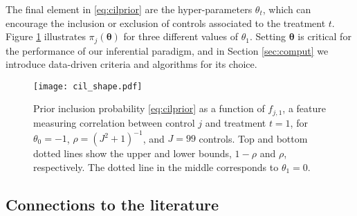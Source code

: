 \documentclass[12pt]{article}
\newcommand{\btheta}{{\bm{\theta}}}
\newcommand{\omcom}[1]{ {\color{blue} #1} }
\newcommand{\davidcom}[1]{{\color{red} [DR. #1]} }
\begin{document}
The final element in \eqref{eq:cilprior} are the hyper-parameters $\theta_t$, which can encourage the inclusion or exclusion of controls associated to the treatment $t$. 
Figure \ref{fig:theta1} illustrates $\pi_{j}(\btheta)$ for three different values of $\theta_{1}$. Setting $\btheta$ is critical for the performance of our inferential paradigm, and in Section \ref{sec:comput} we introduce data-driven criteria and algorithms for its choice. 

\begin{figure}[h]
\centering
\texttt{[image: cil\_shape.pdf]} 
\caption{Prior inclusion probability \eqref{eq:cilprior} as a function of $f_{j,1}$, a feature measuring correlation between control $j$ and treatment $t=1$, for $\theta_{0}=-1$, $\rho = (J^2 + 1)^{-1}$, and $J=99$ controls. Top and bottom dotted lines show the upper and lower bounds, $1 - \rho$ and $\rho$, respectively. The dotted line in the middle corresponds to $\theta_{1} = 0$.} %
\label{fig:theta1}
\end{figure}

\subsection{Connections to the literature}
\label{sec:other_methods}

\end{document}
